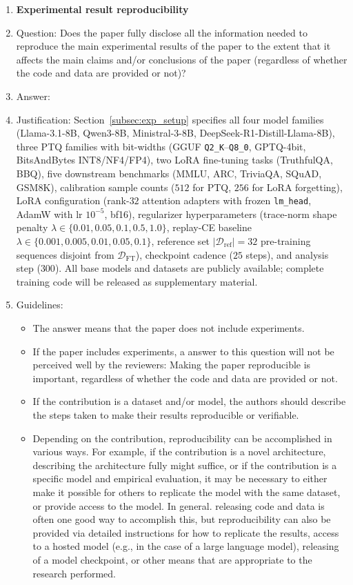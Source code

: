 \begin{enumerate}
    \item {\bf Experimental result reproducibility}
    \item[] Question: Does the paper fully disclose all the information needed to reproduce the main experimental results of the paper to the extent that it affects the main claims and/or conclusions of the paper (regardless of whether the code and data are provided or not)?
    \item[] Answer: \answerYes{}
    \item[] Justification: Section~\ref{subsec:exp_setup} specifies all four model families (Llama-3.1-8B, Qwen3-8B, Ministral-3-8B, DeepSeek-R1-Distill-Llama-8B), three PTQ families with bit-widths (GGUF \texttt{Q2\_K}--\texttt{Q8\_0}, GPTQ-4bit, BitsAndBytes INT8/NF4/FP4), two LoRA fine-tuning tasks (TruthfulQA, BBQ), five downstream benchmarks (MMLU, ARC, TriviaQA, SQuAD, GSM8K), calibration sample counts ($512$ for PTQ, $256$ for LoRA forgetting), LoRA configuration (rank-$32$ attention adapters with frozen \texttt{lm\_head}, AdamW with lr $10^{-5}$, bf16), regularizer hyperparameters (trace-norm shape penalty $\lambda \in \{0.01, 0.05, 0.1, 0.5, 1.0\}$, replay-CE baseline $\lambda \in \{0.001, 0.005, 0.01, 0.05, 0.1\}$, reference set $|\mathcal{D}_{\mathrm{ref}}|=32$ pre-training sequences disjoint from $\mathcal{D}_{\mathrm{FT}}$), checkpoint cadence ($25$ steps), and analysis step ($300$). All base models and datasets are publicly available; complete training code will be released as supplementary material.
    \item[] Guidelines:
    \begin{itemize}
        \item The answer \answerNA{} means that the paper does not include experiments.
        \item If the paper includes experiments, a \answerNo{} answer to this question will not be perceived well by the reviewers: Making the paper reproducible is important, regardless of whether the code and data are provided or not.
        \item If the contribution is a dataset and\slash or model, the authors should describe the steps taken to make their results reproducible or verifiable.
        \item Depending on the contribution, reproducibility can be accomplished in various ways. For example, if the contribution is a novel architecture, describing the architecture fully might suffice, or if the contribution is a specific model and empirical evaluation, it may be necessary to either make it possible for others to replicate the model with the same dataset, or provide access to the model. In general. releasing code and data is often one good way to accomplish this, but reproducibility can also be provided via detailed instructions for how to replicate the results, access to a hosted model (e.g., in the case of a large language model), releasing of a model checkpoint, or other means that are appropriate to the research performed.

\end{itemize}
\end{enumerate}
